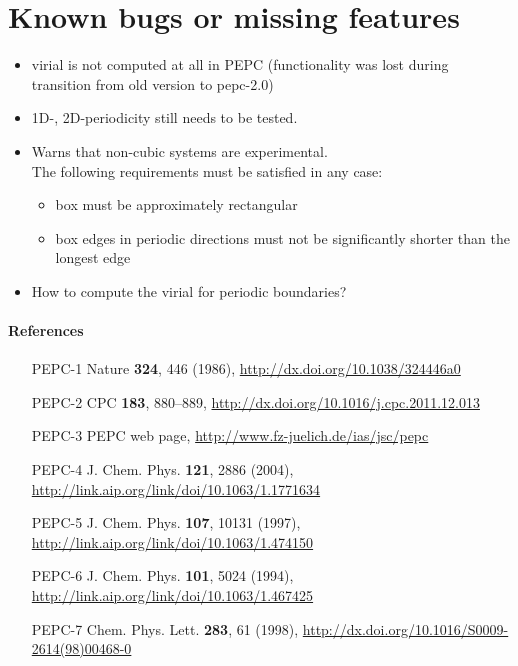 \section*{Known bugs or missing features}
\begin{itemize}
  \item virial is not computed at all in PEPC (functionality was lost during transition from old version to pepc-2.0)
  \item 1D-, 2D-periodicity still needs to be tested.
  \item Warns that non-cubic systems are experimental.\\
      The following requirements must be satisfied in any case:
      \begin{itemize}
        \item box must be approximately rectangular
        \item box edges in periodic directions must not be significantly shorter than the longest edge
      \end{itemize}
  \item How to compute the virial for periodic boundaries?
\end{itemize}

\paragraph{References}
\begin{footnotesize}
\begin{itemize}
  \item[PEPC-1] Nature \textbf{324}, 446 (1986), \url{http://dx.doi.org/10.1038/324446a0}
  \item[PEPC-2] CPC \textbf{183}, 880--889, \url{http://dx.doi.org/10.1016/j.cpc.2011.12.013}
  \item[PEPC-3] PEPC web page, \url{http://www.fz-juelich.de/ias/jsc/pepc}
  \item[PEPC-4] J. Chem. Phys. \textbf{121}, 2886 (2004), \url{http://link.aip.org/link/doi/10.1063/1.1771634}
  \item[PEPC-5] J. Chem. Phys. \textbf{107}, 10131 (1997), \url{http://link.aip.org/link/doi/10.1063/1.474150}
  \item[PEPC-6] J. Chem. Phys. \textbf{101}, 5024 (1994), \url{http://link.aip.org/link/doi/10.1063/1.467425}
  \item[PEPC-7] Chem. Phys. Lett. \textbf{283}, 61 (1998), \url{http://dx.doi.org/10.1016/S0009-2614(98)00468-0}
\end{itemize}
\end{footnotesize}


